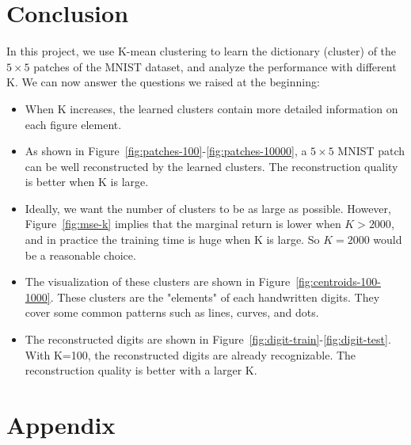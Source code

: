 \documentclass{article}
\begin{document}
\section{Conclusion}

In this project, we use K-mean clustering to learn the dictionary (cluster) of the $5\times 5$ patches of the MNIST dataset, and analyze the performance with different K. We can now answer the questions we raised at the beginning:

\begin{itemize}
    \item When K increases, the learned clusters contain more detailed information on each figure element.
    \item As shown in Figure~\ref{fig:patches-100}-\ref{fig:patches-10000}, a $5\times 5$ MNIST patch can be well reconstructed by the learned clusters. The reconstruction quality is better when K is large.    
    \item Ideally, we want the number of clusters to be as large as possible. However, Figure~\ref{fig:mse-k} implies that the marginal return is lower when $K>2000$, and in practice the training time is huge when K is large. So $K=2000$ would be a reasonable choice.
    \item The visualization of these clusters are shown in Figure~\ref{fig:centroids-100-1000}. These clusters are the "elements" of each handwritten digits. They cover some common patterns such as lines, curves, and dots.
    \item The reconstructed digits are shown in Figure~\ref{fig:digit-train}-\ref{fig:digit-test}. With K=100, the reconstructed digits are already recognizable. The reconstruction quality is better with a larger K.
\end{itemize}

\newpage
\section*{Appendix}








\end{document}
